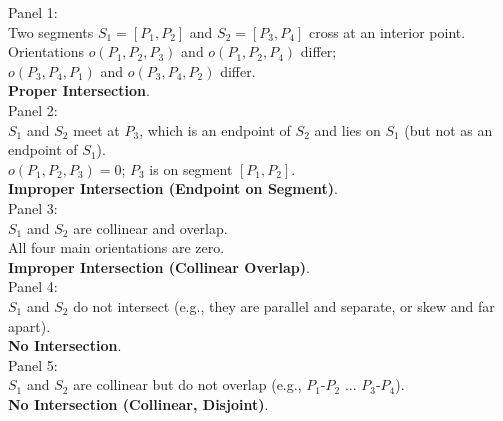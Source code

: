 \begin{visualexample}
\label{vis:A.1.5.segment_intersection_cases}
\begin{flushleft}
Panel 1: \\
  Two segments $S_1 = [P_1, P_2]$ and $S_2 = [P_3, P_4]$ cross at an interior point. \\
  Orientations $o(P_1, P_2, P_3)$ and $o(P_1, P_2, P_4)$ differ; \\
  $o(P_3, P_4, P_1)$ and $o(P_3, P_4, P_2)$ differ. \\
  \textbf{Proper Intersection}.
\\
Panel 2: \\
  $S_1$ and $S_2$ meet at $P_3$, which is an endpoint of $S_2$ and lies on $S_1$ (but not as an endpoint of $S_1$). \\
  $o(P_1, P_2, P_3) = 0$; $P_3$ is on segment $[P_1, P_2]$. \\
  \textbf{Improper Intersection (Endpoint on Segment)}.
\\
Panel 3: \\
  $S_1$ and $S_2$ are collinear and overlap. \\
  All four main orientations are zero. \\
  \textbf{Improper Intersection (Collinear Overlap)}.
\\
Panel 4: \\
  $S_1$ and $S_2$ do not intersect (e.g., they are parallel and separate, or skew and far apart). \\
  \textbf{No Intersection}.
\\
Panel 5: \\
  $S_1$ and $S_2$ are collinear but do not overlap (e.g., $P_1$-$P_2$ ... $P_3$-$P_4$). \\
  \textbf{No Intersection (Collinear, Disjoint)}.
\end{flushleft}
\end{visualexample}


